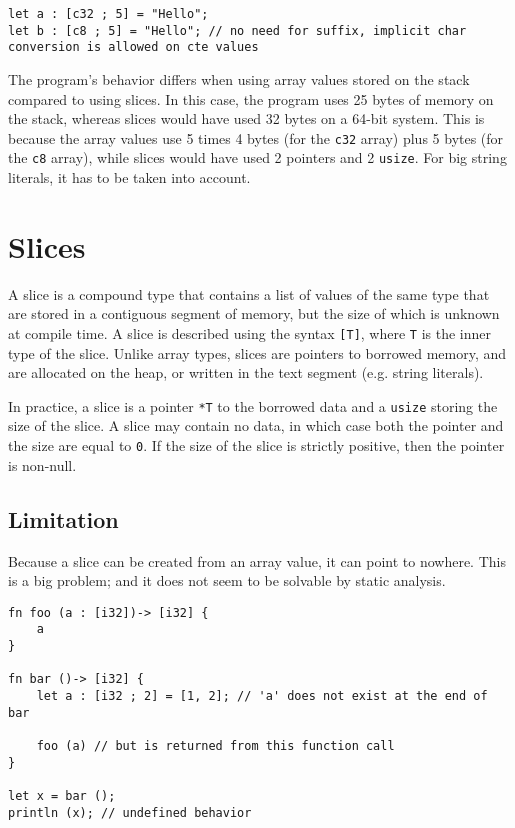 \begin{lstlisting}[style=coloredverbatim]
let a : [c32 ; 5] = "Hello";
let b : [c8 ; 5] = "Hello"; // no need for suffix, implicit char conversion is allowed on cte values
\end{lstlisting}

The program's behavior differs when using array values stored on the stack
compared to using slices. In this case, the program uses 25 bytes of memory on
the stack, whereas slices would have used 32 bytes on a 64-bit system. This is
because the array values use 5 times 4 bytes (for the \texttt{c32} array) plus 5
bytes (for the \texttt{c8} array), while slices would have used 2 pointers and 2
\texttt{usize}. For big string literals, it has to be taken into account.

\section{Slices}%
\label{sec:slices}

A slice is a compound type that contains a list of values of the same type that
are stored in a contiguous segment of memory, but the size of which is unknown
at compile time. A slice is described using the syntax \texttt{[T]}, where
\texttt{T} is the inner type of the slice. Unlike array types, slices are
pointers to borrowed memory, and are allocated on the heap, or written in the
text segment (e.g. string literals).

In practice, a slice is a pointer \texttt{*T} to the borrowed data and a
\texttt{usize} storing the size of the slice. A slice may contain no data, in
which case both the pointer and the size are equal to \texttt{0}. If the size of
the slice is strictly positive, then the pointer is non-null.




\subsection{Limitation}%
\label{sec:slice_lim}

Because a slice can be created from an array value, it can point to nowhere.
This is a big problem; and it does not seem to be solvable by static analysis.

\begin{lstlisting}[style=coloredverbatim]
fn foo (a : [i32])-> [i32] {
    a
}

fn bar ()-> [i32] {
    let a : [i32 ; 2] = [1, 2]; // 'a' does not exist at the end of bar

    foo (a) // but is returned from this function call
}

let x = bar ();
println (x); // undefined behavior
\end{lstlisting}

